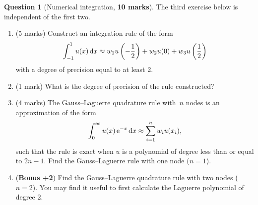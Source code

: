 \documentclass[11pt]{article}
\theoremstyle{definition}
\newtheorem{question}{Question}
\begin{document}
\newpage
\begin{question}
    [Numerical integration, \textbf{10 marks}]
    The third exercise below is independent of the first two.
    \begin{enumerate}
        \item (5 marks)
            Construct an integration rule of the form
            \[
                \int_{-1}^{1} u(x) \, \mathrm d x \approx w_1 u\left(-\frac{1}{2} \right) + w_2 u(0) +  w_3 u\left(\frac{1}{2} \right)
            \]
            with a degree of precision equal to at least 2.

        \item
            (1 mark)
            What is the degree of precision of the rule constructed?

        \item (4 marks)
            The Gauss--Laguerre quadrature rule with~$n$ nodes is an approximation of the form
            \[
                \int_{0}^{\infty} u(x) \, \mathrm e^{-x} \, \mathrm d x \approx \sum_{i=1}^{n} w_i u(x_i),
            \]
            such that the rule is exact when $u$ is a polynomial of degree less than or equal to $2n-1$.
            Find the Gauss--Laguerre rule with one node ($n = 1$).

        \item (\textbf{Bonus +2})
            Find the Gauss--Laguerre quadrature rule with two nodes ($n = 2$).
            You may find it useful to first calculate the Laguerre polynomial of degree 2.
    \end{enumerate}
\end{question}
\end{document}
